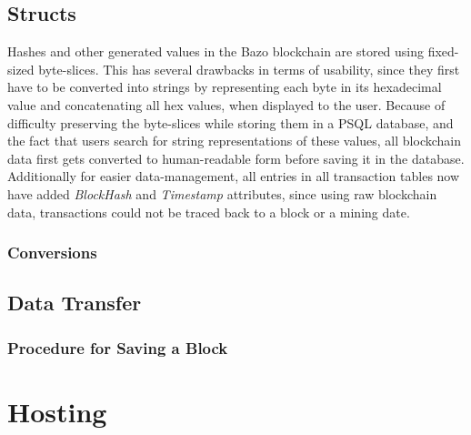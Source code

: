 \subsection{Structs}
Hashes and other generated values in the Bazo blockchain are stored using fixed-sized byte-slices. This has several drawbacks in terms of usability, since they first have to be converted into strings by representing each byte in its hexadecimal value and concatenating all hex values, when displayed to the user. Because of difficulty preserving the byte-slices while storing them in a PSQL database, and the fact that users search for string representations of these values, all blockchain data first gets converted to human-readable form before saving it in the database. Additionally for easier data-management, all entries in all transaction tables now have added \emph{BlockHash} and \emph{Timestamp} attributes, since using raw blockchain data, transactions could not be traced back to a block or a mining date.

\subsubsection{Conversions}

\subsection{Data Transfer}

\subsubsection{Procedure for Saving a Block}

\section{Hosting}